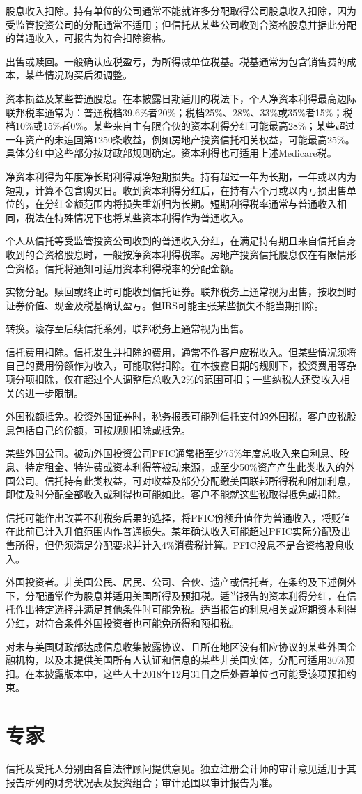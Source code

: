 \documentclass[UTF8,fontset=none,11pt,a4paper]{ctexart}
\begin{document}
股息收入扣除。持有单位的公司通常不能就许多分配取得公司股息收入扣除，因为受监管投资公司的分配通常不适用；但信托从某些公司收到合资格股息并据此分配的普通收入，可报告为符合扣除资格。


出售或赎回。一般确认应税盈亏，为所得减单位税基。税基通常为包含销售费的成本，某些情况购买后须调整。


资本损益及某些普通股息。在本披露日期适用的税法下，个人净资本利得最高边际联邦税率通常为：普通税档39.6\%者20\%；税档25\%、28\%、33\%或35\%者15\%；税档10\%或15\%者0\%。某些来自主有限合伙的资本利得分红可能最高28\%；某些超过一年资产的未追回第1250条收益，例如房地产投资信托相关权益，可能最高25\%。具体分红中这些部分按财政部规则确定。资本利得也可适用上述Medicare税。


净资本利得为年度净长期利得减净短期损失。持有超过一年为长期，一年或以内为短期，计算不包含购买日。收到资本利得分红后，在持有六个月或以内亏损出售单位的，在分红金额范围内将损失重新归为长期。短期利得税率通常与普通收入相同，税法在特殊情况下也将某些资本利得作为普通收入。


个人从信托等受监管投资公司收到的普通收入分红，在满足持有期且来自信托自身收到的合资格股息时，一般按净资本利得税率。房地产投资信托股息仅在有限情形合资格。信托将通知可适用资本利得税率的分配金额。


实物分配。赎回或终止时可能收到信托证券。联邦税务上通常视为出售，按收到时证券价值、现金及税基确认盈亏。但IRS可能主张某些损失不能当期扣除。


转换。滚存至后续信托系列，联邦税务上通常视为出售。


信托费用扣除。信托发生并扣除的费用，通常不作客户应税收入。但某些情况须将自己的费用份额作为收入，可能取得扣除。在本披露日期的规则下，投资费用等杂项分项扣除，仅在超过个人调整后总收入2\%的范围可扣；一些纳税人还受收入相关的进一步限制。


外国税额抵免。投资外国证券时，税务报表可能列信托支付的外国税，客户应税股息包括自己的份额，可按规则扣除或抵免。


某些外国公司。被动外国投资公司PFIC通常指至少75\%年度总收入来自利息、股息、特定租金、特许费或资本利得等被动来源，或至少50\%资产产生此类收入的外国公司。信托持有此类权益，可对收益及部分分配缴美国联邦所得税和附加利息，即使及时分配全部收入或利得也可能如此。客户不能就这些税取得抵免或扣除。


信托可能作出改善不利税务后果的选择，将PFIC份额升值作为普通收入，将贬值在此前已计入升值范围内作普通损失。某年确认收入可能超过PFIC实际分配及出售所得，但仍须满足分配要求并计入4\%消费税计算。PFIC股息不是合资格股息收入。


外国投资者。非美国公民、居民、公司、合伙、遗产或信托者，在条约及下述例外下，分配通常作为股息并适用美国所得及预扣税。适当报告的资本利得分红，在信托作出特定选择并满足其他条件时可能免税。适当报告的利息相关或短期资本利得分红，对符合条件外国投资者也可能免所得和预扣税。


对未与美国财政部达成信息收集披露协议、且所在地区没有相应协议的某些外国金融机构，以及未提供美国所有人认证和信息的某些非美国实体，分配可适用30\%预扣。在本披露版本中，这些人士2018年12月31日之后处置单位也可能受该项预扣约束。


\section*{专家}
信托及受托人分别由各自法律顾问提供意见。独立注册会计师的审计意见适用于其报告所列的财务状况表及投资组合；审计范围以审计报告为准。
\end{document}
